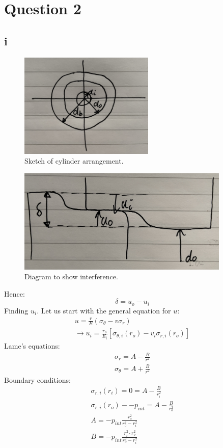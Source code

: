 \documentclass[11pt]{article}
\numberwithin{equation}{section}
\begin{document}
\section{Question 2}
\subsection{i}
\begin{figure}[H]
    \centering
    \includegraphics[height =5cm]{./img/q2i2.jpg}
    \caption{Sketch of cylinder arrangement.}
\end{figure}
\begin{figure}[H]
    \centering
    \includegraphics[height =5cm]{./img/q2i1.jpg}
    \caption{Diagram to show interference.}
\end{figure}
Hence:
\begin{equation}
    \delta = u_o - u_i
\end{equation}
Finding $u_i$. Let us start with the general equation for $u$:
\begin{gather}
    u = \frac{r}{E}\left(\sigma_{\theta} - v \sigma_r\right)\\
    \rightarrow u_i = \frac{r_o}{E_i}\left[\sigma_{\theta, i} \left(r_o\right) - v_i \sigma_{r,i} (r_o)\right]
\end{gather}
Lame's equations:
\begin{gather}
    \sigma_r = A - \frac{B}{r^2}\\
    \sigma_{\theta} = A + \frac{B}{r^2}
\end{gather}
Boundary conditions:
\begin{gather}
    \sigma_{r,i}(r_i) = 0 = A - \frac{B}{r_i^2}\\
    \sigma_{r,i}(r_o) - -p_{int} = A - \frac{B}{r_o^2}\\
    A = -p_{int}\frac{r_o^2}{r_o^2 - r_i^2}\\
    B = -p_{int}\frac{r_i^2 \cdot r_o^2}{r_o^2 - r_i^2}
\end{gather}
\end{document}
